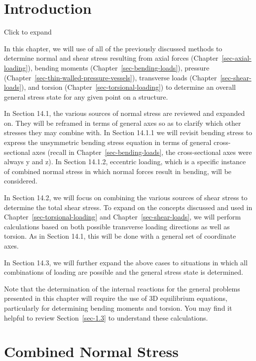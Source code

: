 \documentclass[
  letterpaper,
  DIV=11,
  numbers=noendperiod]{scrreprt}
\theoremstyle{definition}
\theoremstyle{remark}
\begin{document}
\section*{Introduction}\label{introduction-13}


Click to expand

In this chapter, we will use of all of the previously discussed methods
to determine normal and shear stress resulting from axial forces
(Chapter~\ref{sec-axial-loading}), bending moments
(Chapter~\ref{sec-bending-loads}), pressure
(Chapter~\ref{sec-thin-walled-pressure-vessels}), transverse loads
(Chapter~\ref{sec-shear-loads}), and torsion
(Chapter~\ref{sec-torsional-loading}) to determine an overall general
stress state for any given point on a structure.

In Section 14.1, the various sources of normal stress are reviewed and
expanded on. They will be reframed in terms of general axes so as to
clarify which other stresses they may combine with. In Section 14.1.1 we
will revisit bending stress to express the unsymmetric bending stress
equation in terms of general cross-sectional axes (recall in
Chapter~\ref{sec-bending-loads}, the cross-sectional axes were always y
and z). In Section 14.1.2, eccentric loading, which is a specific
instance of combined normal stress in which normal forces result in
bending, will be considered.

In Section 14.2, we will focus on combining the various sources of shear
stress to determine the total shear stress. To expand on the concepts
discussed and used in Chapter~\ref{sec-torsional-loading} and
Chapter~\ref{sec-shear-loads}, we will perform calculations based on
both possible transverse loading directions as well as torsion. As in
Section 14.1, this will be done with a general set of coordinate axes.

In Section 14.3, we will further expand the above cases to situations in
which all combinations of loading are possible and the general stress
state is determined.

Note that the determination of the internal reactions for the general
problems presented in this chapter will require the use of 3D
equilibrium equations, particularly for determining bending moments and
torsion. You may find it helpful to review Section~\ref{sec-1.3} to
understand these calculations.

\section{Combined Normal Stress}\label{sec-14.1}
\end{document}
